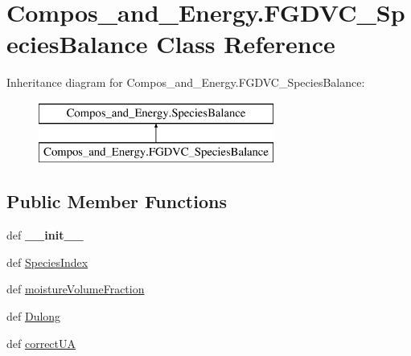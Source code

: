 \hypertarget{classCompos__and__Energy_1_1FGDVC__SpeciesBalance}{\section{\-Compos\-\_\-and\-\_\-\-Energy.\-F\-G\-D\-V\-C\-\_\-\-Species\-Balance \-Class \-Reference}
\label{classCompos__and__Energy_1_1FGDVC__SpeciesBalance}
}
\-Inheritance diagram for \-Compos\-\_\-and\-\_\-\-Energy.\-F\-G\-D\-V\-C\-\_\-\-Species\-Balance\-:\begin{figure}[H]
\begin{center}
\leavevmode
\includegraphics[height=2.000000cm]{classCompos__and__Energy_1_1FGDVC__SpeciesBalance}
\end{center}
\end{figure}
\subsection*{\-Public \-Member \-Functions}
\begin{DoxyCompactItemize}
\item 
\hypertarget{classCompos__and__Energy_1_1FGDVC__SpeciesBalance_ae74f897eb058271f9d11fce7ec511c82}{def {\bfseries \-\_\-\-\_\-init\-\_\-\-\_\-}}\label{classCompos__and__Energy_1_1FGDVC__SpeciesBalance_ae74f897eb058271f9d11fce7ec511c82}

\item 
def \hyperlink{classCompos__and__Energy_1_1SpeciesBalance_a5fec9a8d342543711abe2fc10632efb0}{\-Species\-Index}
\item 
def \hyperlink{classCompos__and__Energy_1_1SpeciesBalance_ae6b9b1a304a5b3686888725624c5e329}{moisture\-Volume\-Fraction}
\item 
def \hyperlink{classCompos__and__Energy_1_1SpeciesBalance_abeff1c726b62ba6c2d32173eb7f51d48}{\-Dulong}
\item 
def \hyperlink{classCompos__and__Energy_1_1SpeciesBalance_a05ae92b73a997e779c64bd2e6386a918}{correct\-U\-A}
\end{DoxyCompactItemize}

